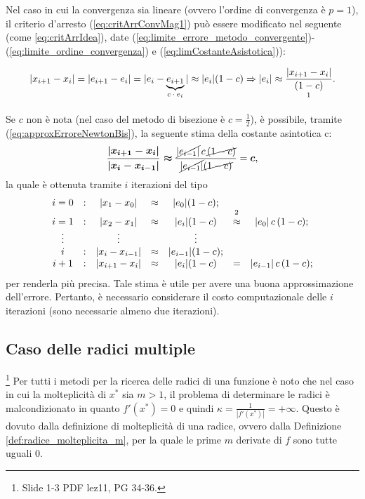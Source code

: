 Nel caso in cui la convergenza sia lineare (ovvero l'ordine di convergenza è $p=1$), il criterio d'arresto (\ref{eq:critArrConvMag1}) può essere modificato nel seguente (come \ref{eq:critArrIdea}), date (\ref{eq:limite_errore_metodo_convergente})-(\ref{eq:limite_ordine_convergenza}) e (\ref{eq:limCostanteAsistotica})):

\begin{equation}\label{eq:approxErroreNewtonBis}
	|x_{i+1}-x_i|=|e_{i+1}-e_i|=|e_i-\underbrace{e_{i+1}}_\text{$c\cdot e_i$}|\approx |e_i|(1-c)\Rightarrow |e_i|\approx\frac{|x_{i+1}-x_i|}{\underset{\footnotemark}{(1-c)}}.
\end{equation}

Se $c$ non è nota (nel caso del metodo di bisezione è $c=\frac{1}{2}$), è possibile, tramite (\ref{eq:approxErroreNewtonBis}), la seguente stima della costante asintotica c:
\begin{equation*}
	\boldsymbol{\frac{|x_{i+1}-x_i|}{|x_i-x_{i-1}|}\approx}\frac{\cancel{|e_{i-1}|}\,c\,\cancel{(1-c)}}{\cancel{|e_{i-1}|}\cancel{(1-c)}}=\boldsymbol c,
\end{equation*}
la quale è ottenuta tramite $i$ iterazioni del tipo
\begin{equation*}
	\begin{matrix}
		i=0 &:& |x_1-x_0|&\approx& |e_0|(1-c);\\
		i=1 &:& |x_2-x_1|&\approx&|e_i|(1-c)&\overset{\footnotemark}{\approx}&|e_0|\, c\, (1-c);\\
		\vdots & & \vdots & & \vdots \\
		i &:&|x_i-x_{i-1}|&\approx& |e_{i-1}|(1-c);\\
		i+1 &:&|x_{i+1}-x_i|&\approx& |e_i|(1-c) &=& |e_{i-1}|\, c\, (1-c);
	\end{matrix}
\end{equation*}
per renderla più precisa. Tale stima è utile per avere una buona  approssimazione dell'errore. Pertanto, è necessario considerare il costo computazionale delle $i$ iterazioni (sono necessarie almeno due iterazioni).

\subsection{Caso delle radici multiple}
\footnote{Slide 1-3 PDF lez11, PG 34-36.}
Per tutti i metodi per la ricerca delle radici di una funzione è noto che nel caso in cui la molteplicità di $x^*$ sia $m>1$, il problema di determinare le radici è malcondizionato in quanto $f'(x^*) = 0$ e quindi $\kappa = \frac{1}{|f'(x^*)|}=+\infty$. Questo è dovuto dalla definizione di molteplicità di una radice, ovvero dalla Definizione \ref{def:radice_molteplicita_m}, per la quale le prime $m$ derivate di $f$ sono tutte uguali 0.

